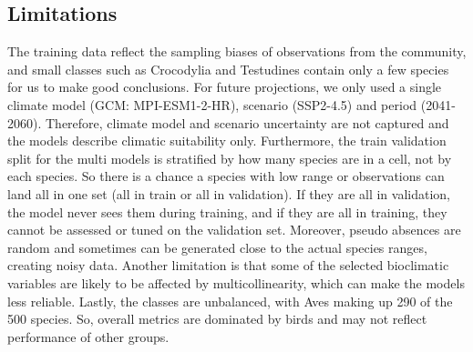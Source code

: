 \documentclass{article}
\begin{document}
\subsection{Limitations}
The training data reflect the sampling biases of observations from the community, and small classes such as Crocodylia and Testudines contain only a few species for us to make good conclusions. For future projections, we only used a single climate model (GCM: MPI-ESM1-2-HR), scenario (SSP2-4.5) and period (2041-2060). Therefore, climate model and scenario uncertainty are not captured and the models describe climatic suitability only.
Furthermore, the train validation split for the multi models is stratified by how many species are in a cell, not by each species. So there is a chance a species with low range or observations can land all in one set (all in train or all in validation). If they are all in validation, the model never sees them during training, and if they are all in training, they cannot be assessed or tuned on the validation set. Moreover, pseudo absences are random and sometimes can be generated close to the actual species ranges, creating noisy data. Another limitation is that some of the selected bioclimatic variables are likely to be affected by multicollinearity, which can make the models less reliable. Lastly, the classes are unbalanced, with Aves making up 290 of the 500 species. So, overall metrics are dominated by birds and may not reflect performance of other groups.
\end{document}
